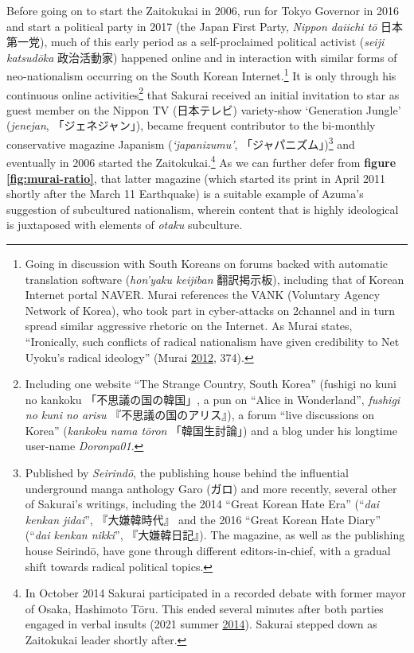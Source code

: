 \documentclass[10pt,british,A4paper,,openany]{memoir}
\begin{document}
Before going on to start the Zaitokukai in 2006, run for Tokyo Governor
in 2016 and start a political party in 2017 (the Japan First Party,
\emph{Nippon daiichi tō} 日本第一党), much of this early period as a
self-proclaimed political activist (\emph{seiji katsudōka} 政治活動家)
happened online and in interaction with similar forms of neo-nationalism
occurring on the South Korean Internet.\footnote{Going in discussion
  with South Koreans on forums backed with automatic translation
  software (\emph{hon'yaku keijiban} 翻訳掲示板), including that of
  Korean Internet portal NAVER. Murai references the VANK (Voluntary
  Agency Network of Korea), who took part in cyber-attacks on 2channel
  and in turn spread similar aggressive rhetoric on the Internet. As
  Murai states, ``Ironically, such conflicts of radical nationalism have
  given credibility to Net Uyoku's radical ideology'' (Murai
  \protect\hyperlink{ref-murai_net_2012}{2012}, 374).} It is only
through his continuous online activities\footnote{Including one website
  ``The Strange Country, South Korea'' (fushigi no kuni no kankoku
  「不思議の国の韓国」, a pun on ``Alice in Wonderland'', \emph{fushigi
  no kuni no arisu} 『不思議の国のアリス』), a forum ``live discussions
  on Korea'' (\emph{kankoku nama tōron} 「韓国生討論」) and a blog under
  his longtime user-name \emph{Doronpa01}.} that Sakurai received an
initial invitation to star as guest member on the Nippon TV (日本テレビ)
variety-show `Generation Jungle' (\emph{jenejan}, 「ジェネジャン」),
became frequent contributor to the bi-monthly conservative magazine
Japanism (\emph{`japanizumu'}, 「ジャパニズム」)\footnote{Published by
  \emph{Seirindō}, the publishing house behind the influential
  underground manga anthology Garo (ガロ) and more recently, several
  other of Sakurai's writings, including the 2014 ``Great Korean Hate
  Era'' (``\emph{dai kenkan jidai}'', 『大嫌韓時代』 and the 2016
  ``Great Korean Hate Diary'' (``\emph{dai kenkan nikki}'',
  『大嫌韓日記』). The magazine, as well as the publishing house
  Seirindō, have gone through different editors-in-chief, with a gradual
  shift towards radical political topics.} and eventually in 2006
started the Zaitokukai.\footnote{In October 2014 Sakurai participated in
  a recorded debate with former mayor of Osaka, Hashimoto Tōru. This
  ended several minutes after both parties engaged in verbal insults
  (2021 summer \protect\hyperlink{ref-2021_summer_vs_2014}{2014}).
  Sakurai stepped down as Zaitokukai leader shortly after.} As we can
further defer from \textbf{figure \ref{fig:murai-ratio}}, that latter
magazine (which started its print in April 2011 shortly after the March
11 Earthquake) is a suitable example of Azuma's suggestion of
subcultured nationalism, wherein content that is highly ideological is
juxtaposed with elements of \emph{otaku} subculture.
\end{document}
